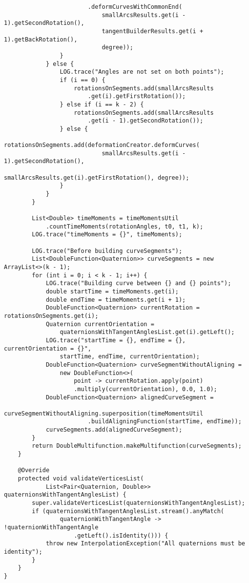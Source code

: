 \begin{verbatim}
                        .deformCurvesWithCommonEnd(
                            smallArcsResults.get(i - 1).getSecondRotation(),
                            tangentBuilderResults.get(i + 1).getBackRotation(),
                            degree));
                }
            } else {
                LOG.trace("Angles are not set on both points");
                if (i == 0) {
                    rotationsOnSegments.add(smallArcsResults
                        .get(i).getFirstRotation());
                } else if (i == k - 2) {
                    rotationsOnSegments.add(smallArcsResults
                        .get(i - 1).getSecondRotation());
                } else {
                    rotationsOnSegments.add(deformationCreator.deformCurves(
                            smallArcsResults.get(i - 1).getSecondRotation(),
                            smallArcsResults.get(i).getFirstRotation(), degree));
                }
            }
        }

        List<Double> timeMoments = timeMomentsUtil
            .countTimeMoments(rotationAngles, t0, t1, k);
        LOG.trace("timeMoments = {}", timeMoments);

        LOG.trace("Before building curveSegments");
        List<DoubleFunction<Quaternion>> curveSegments = new ArrayList<>(k - 1);
        for (int i = 0; i < k - 1; i++) {
            LOG.trace("Building curve between {} and {} points");
            double startTime = timeMoments.get(i);
            double endTime = timeMoments.get(i + 1);
            DoubleFunction<Quaternion> currentRotation = rotationsOnSegments.get(i);
            Quaternion currentOrientation =
                quaternionsWithTangentAnglesList.get(i).getLeft();
            LOG.trace("startTime = {}, endTime = {}, currentOrientation = {}",
                startTime, endTime, currentOrientation);
            DoubleFunction<Quaternion> curveSegmentWithoutAligning =
                new DoubleFunction<>(
                    point -> currentRotation.apply(point)
                    .multiply(currentOrientation), 0.0, 1.0);
            DoubleFunction<Quaternion> alignedCurveSegment =
                    curveSegmentWithoutAligning.superposition(timeMomentsUtil
                        .buildAligningFunction(startTime, endTime));
            curveSegments.add(alignedCurveSegment);
        }
        return DoubleMultifunction.makeMultifunction(curveSegments);
    }

    @Override
    protected void validateVerticesList(
            List<Pair<Quaternion, Double>> quaternionsWithTangentAnglesList) {
        super.validateVerticesList(quaternionsWithTangentAnglesList);
        if (quaternionsWithTangentAnglesList.stream().anyMatch(
                quaternionWithTangentAngle -> !quaternionWithTangentAngle
                    .getLeft().isIdentity())) {
            throw new InterpolationException("All quaternions must be identity");
        }
    }
}
\end{verbatim}
